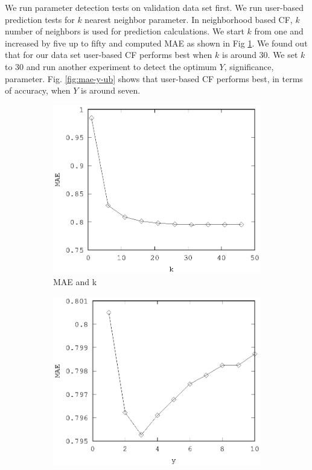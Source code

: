 \documentclass[conference]{IEEEtran}
\begin{document}
We run parameter detection tests on validation data set first. We run user-based
prediction tests for $k$ nearest neighbor parameter. In neighborhood based CF, 
$k$ number of neighbors is used for prediction calculations. We start $k$ from 
one and increased by five up to fifty and computed MAE as shown in 
Fig \ref{fig:mae-k-ub}. We found out that for our data set user-based CF 
performs best when $k$ is around 30. We set $k$ to 30 and run another 
experiment to detect the optimum $Y$, significance, parameter. 
Fig. \ref{fig:mae-y-ub} shows that user-based CF performs best, in terms of
accuracy, when $Y$ is around seven.
\begin{figure}
        \begin{subfigure}[b]{0.225\textwidth}
                \includegraphics[width=\textwidth]{charts/ub-mae-k.eps}
                \caption{MAE and k}
                \label{fig:mae-k-ub}
        \end{subfigure}
        \quad
        \begin{subfigure}[b]{0.225\textwidth}
                \includegraphics[width=\textwidth]{charts/ub-mae-y.eps}

\end{subfigure}
\end{figure}
\end{document}
